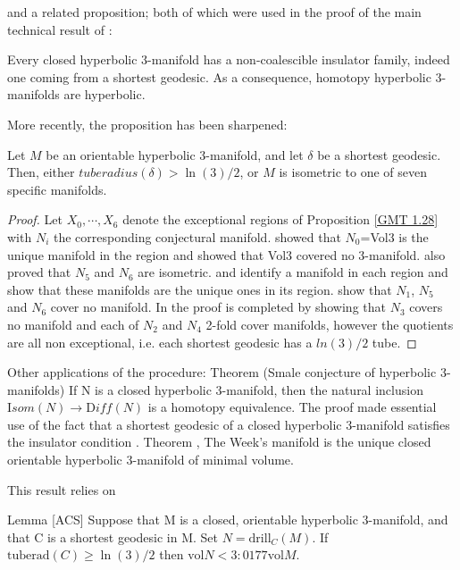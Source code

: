 and a related proposition; both of which were used in the proof of
the main technical result of \cite{GMT}:
\begin{theorem}{\cite{GMT}}\label{GMT 0.1}\label{GMT 0.2}
Every closed hyperbolic $3$-manifold
has a non-coalescible insulator family,
indeed one coming from a shortest geodesic.
As a consequence,
homotopy hyperbolic $3$-manifolds are hyperbolic.
\end{theorem}
More recently, the proposition has been sharpened:
\begin{theorem}{}
Let $M$ be an orientable hyperbolic $3$-manifold,
and let $\delta$ be a shortest geodesic.
Then, either ${\mathit tuberadius}(\delta) > \ln(3)/2$, or
$M$ is isometric to one of seven specific manifolds.
\end{theorem}
\begin{proof}{}
	Let $X_0, \cdots, X_6$ denote the exceptional regions of Proposition \ref{GMT 1.28}
with $N_i$ the corresponding conjectural manifold.
\cite{GMT} showed that $N_0$=Vol3 is the unique manifold in the region
and \cite{JR} showed that Vol3 covered no 3-manifold.
	\cite{JR} also proved that $N_5$ and $N_6$ are isometric.
\cite{CLLMR} and \cite{L} identify a manifold in each region
and \cite{CLLMR} show that these manifolds are the unique ones in its region.
\cite{CLLMR} show that $N_1$, $N_5$ and $N_6$ cover no manifold.
In \cite{GT} the proof is completed by showing that $N_3$ covers no manifold
and each of $N_2$ and $N_4$ 2-fold cover manifolds,
however the quotients are all non exceptional,
i.e. each shortest geodesic has a $ln(3)/2$ tube.
\end{proof}

Other applications of the procedure:
\vskip 8pt
Theorem \cite{G}  (Smale conjecture of hyperbolic 3-manifolds)
If N is a closed hyperbolic 3-manifold,
then the natural inclusion ${\mathrm Isom}(N)\to {\mathrm Diff}(N)$ is a homotopy equivalence.
\vskip 8pt
The proof made essential use of the fact that a shortest geodesic
of a closed hyperbolic 3-manifold satisfies the insulator condition \cite{GMT}.
\vskip 8pt
Theorem \cite{GMM}, \cite{Mi} The Week's manifold
is the unique closed orientable hyperbolic 3-manifold of minimal volume.

This result relies on 

Lemma [ACS] Suppose that M is a closed, orientable hyperbolic 3-manifold,
and that C is a shortest geodesic in M.
Set $N = \mathrm{drill}_C(M)$. If $\mathrm{tuberad}(C) \ge \ln(3)/2$ then
$\mathrm{vol} N < 3:0177 \mathrm{vol}M$.

